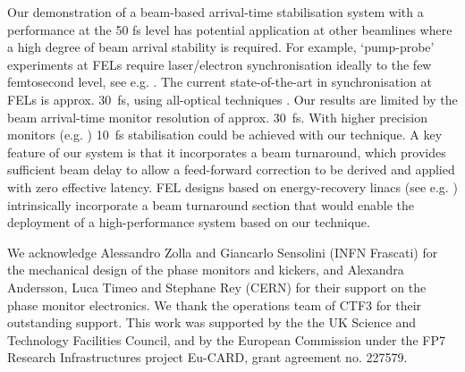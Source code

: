 \documentclass[%
 reprint,
 superscriptaddress,
 amsmath,
 amssymb,
 prl,
]{revtex4-1}
\begin{document}
Our demonstration of a beam-based arrival-time stabilisation system with a 
performance at the 50 fs level has potential application at other beamlines 
where a high degree of beam arrival stability is required.  For example, 
`pump-probe' experiments at FELs require laser/electron synchronisation ideally 
to the few femtosecond level, see e.g. \cite{Savelyev2017}. The current 
state-of-the-art in synchronisation at FELs is approx. 30~fs, using all-optical 
techniques \cite{FLASHnature}. Our results are limited by the beam arrival-time 
monitor resolution of approx. 30~fs. With higher precision monitors (e.g. 
\cite{flashPRL}) 10~fs stabilisation could be achieved with our technique. A 
key feature of our system is that it incorporates a beam turnaround, which 
provides sufficient beam delay to allow a feed-forward correction to be derived 
and applied with zero effective latency. FEL designs based on energy-recovery 
linacs (see e.g. \cite{Sekutowicz2005,Kwang2008,Jackson2016}) intrinsically 
incorporate a beam turnaround section that would enable the deployment of a 
high-performance system based on our technique.

\begin{acknowledgments}
	We acknowledge Alessandro Zolla and Giancarlo Sensolini (INFN 
	Frascati) for the mechanical design of the phase monitors and 
	kickers, and Alexandra Andersson, Luca Timeo and Stephane Rey (CERN) for 
	their support on the phase monitor electronics. We thank the 
	operations team of CTF3 for their outstanding support. This work was  
	supported by the the UK Science and Technology Facilities 
	Council, and by the European Commission under the FP7 Research 
	Infrastructures project Eu-CARD, grant agreement no. 227579.
\end{acknowledgments}


\end{document}

